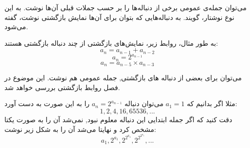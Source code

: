 
\begin{DEFINITION}
    \p
    می‌توان جمله‌ی عمومی برخی از دنباله‌ها را بر حسب جملات قبلی آن‌ها نوشت.
    به این نوع نوشتار،
    گویند.
    به دنباله‌هایی که بتوان برای آن‌ها نمایش بازگشتی نوشت،
    گفته می‌شود.
\end{DEFINITION}

به طور مثال، روابط زیر، نمایش‌های بازگشتی از چند دنباله بازگشتی هستند:
$$a_n=a_{n-1}+a_{n-2}$$
$$a_n=2^{a_{n-1}}$$
$$a_n=a_{n-5}\times a_{n-3}$$

می‌توان برای بعضی از دنباله های بازگشتی, جمله عمومی هم نوشت. این موضوع در فصل روابط بازگشتی بررسی خواهد شد.

\p
مثلا اگر بدانیم که 
$a_1=1$
می‌توان دنباله
$a_n=2^{a_{n-1}}$
را به این صورت به دست آورد:
\[1,2,4,16,65536,...\]
دقت کنید که اگر جمله ابتدایی این دنباله معلوم نبود, نمی‌شد آن را به صورت یکتا مشخص کرد و نهایتا می‌شد آن را به شکل زیر نوشت:
\[a_1,2^{a_1},2^{2^{a_1}},2^{2^{2^{a_1}}},...\]








